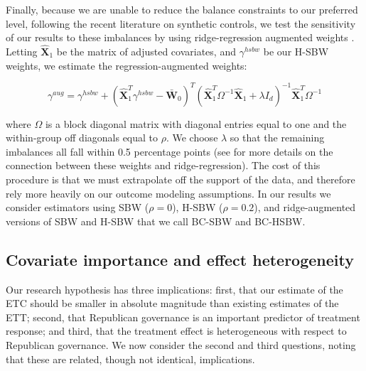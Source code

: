 \documentclass[aoas]{imsart}
\theoremstyle{plain}
\newcommand{\matr}[1]{\mathbf{#1}} %
\theoremstyle{remark}
\begin{document}
Finally, because we are unable to reduce the balance constraints to our preferred level, following the recent literature on synthetic controls, we test the sensitivity of our results to these imbalances by using ridge-regression augmented weights \cite{ben2018augmented}. Letting $\matr{\hat{X}}_1$ be the matrix of adjusted covariates, and $\gamma^{hsbw}$ be our H-SBW weights, we estimate the regression-augmented weights:

\begin{equation}
\gamma^{aug} = \gamma^{hsbw} + (\matr{\hat{X}}_1^T\gamma^{hsbw} - \bar{\matr{W}}_0)^T(\matr{\hat{X}}_1^T\Omega^{-1}\matr{\hat{X}}_1 + \lambda I_d)^{-1}\matr{\hat{X}}_1^T\Omega^{-1}
\end{equation}

where $\Omega$ is a block diagonal matrix with diagonal entries equal to one and the within-group off diagonals equal to $\rho$. We choose $\lambda$ so that the remaining imbalances all fall within 0.5 percentage points (see \cite{ben2018augmented} for more details on the connection between these weights and ridge-regression). The cost of this procedure is that we must extrapolate off the support of the data, and therefore rely more heavily on our outcome modeling assumptions. In our results we consider estimators using SBW ($\rho = 0$), H-SBW ($\rho = 0.2$), and ridge-augmented versions of SBW and H-SBW that we call BC-SBW and BC-HSBW. 

\subsection{Covariate importance and effect heterogeneity}

Our research hypothesis has three implications: first, that our estimate of the ETC should be smaller in absolute magnitude than existing estimates of the ETT; second, that Republican governance is an important predictor of treatment response; and third, that the treatment effect is heterogeneous with respect to Republican governance. We now consider the second and third questions, noting that these are related, though not identical, implications.
\end{document}
